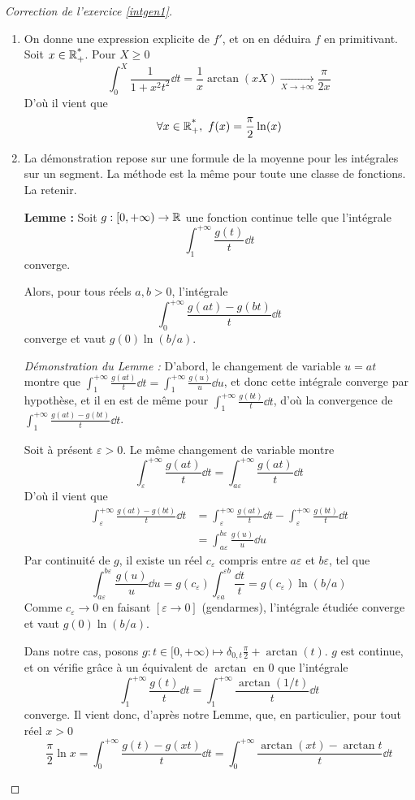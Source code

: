 \begin{proof}[Correction de l'exercice \ref{intgen1}]
\begin{enumerate}
		\item On donne une expression explicite de $f'$, et on en déduira $f$ en primitivant. Soit $x\in\operatorname{\mathbb R_+^*}$.
		Pour $X\geq 0$
		\[
			\int_0^X\frac1{1+x^2t^2}\dd t=\frac1x\arctan(xX)\xrightarrow[X\to+\infty]{}\frac\pi{2x}
		\]
		D'où il vient que
		\[
			\forall x\in\Rpe,\ f(x)=\frac\pi2\ln(x)	
		\]

		\item La démonstration repose sur une formule de la moyenne pour les intégrales sur un segment.
		La méthode est la même pour toute une classe de fonctions. La retenir. 

		\textbf{Lemme :} Soit $g:[0,+\infty)\to \operatorname{\mathbb R}$ une fonction continue telle que l'intégrale
		\[
			\int_1^{+\infty}\frac{g(t)}t\dd t	
		\]
		converge. 

		Alors, pour tous réels $a,b>0$, l'intégrale 
		\[
			\int_0^{+\infty}\frac{g(at)-g(bt)}t\dd t	
		\]
		converge et vaut $g(0)\ln(b/a)$.

		\textit{Démonstration du Lemme :} 
		D'abord, le changement de variable $u=at$ montre que $\int_1^{+\infty}\frac{g(at)}t\dd t=\int_1^{+\infty}\frac{g(u)}u\dd u$,
		et donc cette intégrale converge par hypothèse, et il en est de même pour $\int_1^{+\infty}\frac{g(bt)}t\dd t$, 
		d'où la convergence de $\int_1^{+\infty}\frac{g(at)-g(bt)}t\dd t$.

		Soit à présent $\varepsilon > 0$. 
		Le même changement de variable montre 
		\[
			\int_\varepsilon^{+\infty} \frac{g(at)}t\dd t = \int_{a\varepsilon}^{+\infty}\frac{g(at)}t\dd t
		\]
		D'où il vient que 
		\begin{align*}
			\int_\varepsilon^{+\infty} \frac{g(at)-g(bt)}t\dd t &=\int_\varepsilon^{+\infty} \frac{g(at)}t\dd t-\int_\varepsilon^{+\infty} \frac{g(bt)}t\dd t\\
															   &=\int_{a\varepsilon}^{b\varepsilon} \frac{g(u)}u\dd u
		\end{align*}
		Par continuité de $g$, il existe un réel $c_\varepsilon$ compris entre $a\varepsilon$ et $b\varepsilon$, tel que 
		\[
			\int_{a\varepsilon}^{b\varepsilon} \frac{g(u)}u\dd u=g(c_\varepsilon)\int_{\varepsilon a}^{\varepsilon b}\frac{\dd t}t=g(c_\varepsilon)\ln(b/a)
		\]
		Comme $c_\varepsilon \to 0$ en faisant $[\varepsilon\to 0]$ (gendarmes), l'intégrale étudiée converge et vaut $g(0)\ln(b/a)$.


		Dans notre cas, posons $g:t\in[0,+\infty)\mapsto \delta_{0,t}\frac\pi2+\arctan(t)$.
		$g$ est continue, et on vérifie grâce à un équivalent de $\arctan$ en $0$ que l'intégrale 
		\[
			\int_1^{+\infty}\frac{g(t)}t\dd t = \int_1^{+\infty}\frac{\arctan(1/t)}t\dd t 
		\]
		converge.
		Il vient donc, d'après notre Lemme, que, en particulier, pour tout réel $x>0$
		\[
			\frac\pi2\ln x=\int_0^{+\infty}\frac{g(t)-g(xt)}t\dd t =\int_0^{+\infty}\frac{\arctan(xt)-\arctan t}t\dd t
		\]
	\end{enumerate}
\end{proof}


